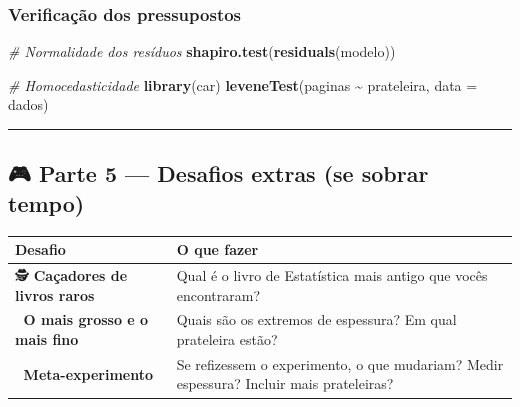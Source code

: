 \documentclass[
]{article}
\newenvironment{Shaded}{\begin{snugshade}}{\end{snugshade}}
\newcommand{\AttributeTok}[1]{\textcolor[rgb]{0.13,0.29,0.53}{#1}}
\newcommand{\CommentTok}[1]{\textcolor[rgb]{0.56,0.35,0.01}{\textit{#1}}}
\newcommand{\FunctionTok}[1]{\textcolor[rgb]{0.13,0.29,0.53}{\textbf{#1}}}
\newcommand{\NormalTok}[1]{#1}
\newcommand{\SpecialCharTok}[1]{\textcolor[rgb]{0.81,0.36,0.00}{\textbf{#1}}}
\newcounter{none} %
\begin{document}
\subsubsection{Verificação dos
pressupostos}\label{verificauxe7uxe3o-dos-pressupostos}

\begin{Shaded}
\begin{Highlighting}[]
\CommentTok{\# Normalidade dos resíduos}
\FunctionTok{shapiro.test}\NormalTok{(}\FunctionTok{residuals}\NormalTok{(modelo))}

\CommentTok{\# Homocedasticidade}
\FunctionTok{library}\NormalTok{(car)}
\FunctionTok{leveneTest}\NormalTok{(paginas }\SpecialCharTok{\textasciitilde{}}\NormalTok{ prateleira, }\AttributeTok{data =}\NormalTok{ dados)}
\end{Highlighting}
\end{Shaded}

\begin{center}\rule{0.5\linewidth}{0.5pt}\end{center}

\subsection{🎮 Parte 5 --- Desafios extras (se sobrar
tempo)}\label{parte-5-desafios-extras-se-sobrar-tempo}

{\def\LTcaptype{none} %
\begin{longtable}[]{@{}
  >{\raggedright\arraybackslash}p{}
  >{\raggedright\arraybackslash}p{}@{}}
\toprule\noalign{}
\begin{minipage}[b]{\linewidth}\raggedright
Desafio
\end{minipage} & \begin{minipage}[b]{\linewidth}\raggedright
O que fazer
\end{minipage} \\
\midrule\noalign{}
\endhead
\bottomrule\noalign{}
\endlastfoot
🕵️ \textbf{Caçadores de livros raros} & Qual é o livro de Estatística
mais antigo que vocês encontraram? \\
📏 \textbf{O mais grosso e o mais fino} & Quais são os extremos de
espessura? Em qual prateleira estão? \\
🤔 \textbf{Meta-experimento} & Se refizessem o experimento, o que
mudariam? Medir espessura? Incluir mais prateleiras? \\
\end{longtable}
}
\end{document}
